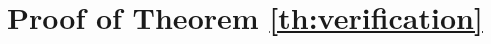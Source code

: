 \documentclass[11pt]{article}
\newcommand \drm {\mathrm{d}}
\newcommand \E {\mathbb{E}}
\numberwithin{equation}{section}
\newcommand{\bpi}{\boldsymbol{\pi}}
\begin{document}
	
	
	
	\appendix
	
\section{Proof of Theorem \ref{th:verification}} \label{app:A}
\end{document}
